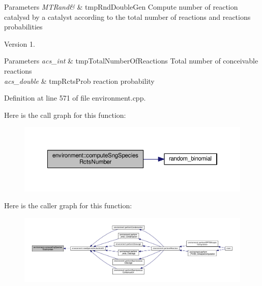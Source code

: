 \begin{DoxyParams}{Parameters}
{\em M\-T\-Rand\&} & tmp\-Rnd\-Double\-Gen Compute number of reaction catalysd by a catalyst according to the total number of reactions and reactions probabilities \\
\hline
\end{DoxyParams}
\begin{DoxyVersion}{Version}
1. 
\end{DoxyVersion}

\begin{DoxyParams}{Parameters}
{\em acs\-\_\-int} & tmp\-Total\-Number\-Of\-Reactions Total number of conceivable reactions \\
\hline
{\em acs\-\_\-double} & tmp\-Rcts\-Prob reaction probability \\
\hline
\end{DoxyParams}


Definition at line 571 of file environment.\-cpp.



Here is the call graph for this function\-:\nopagebreak
\begin{figure}[H]
\begin{center}
\leavevmode
\includegraphics[width=350pt]{a00011_a0fd3cb062d35d2f6dd8961e95dd477b7_cgraph}
\end{center}
\end{figure}




Here is the caller graph for this function\-:\nopagebreak
\begin{figure}[H]
\begin{center}
\leavevmode
\includegraphics[width=350pt]{a00011_a0fd3cb062d35d2f6dd8961e95dd477b7_icgraph}
\end{center}
\end{figure}


